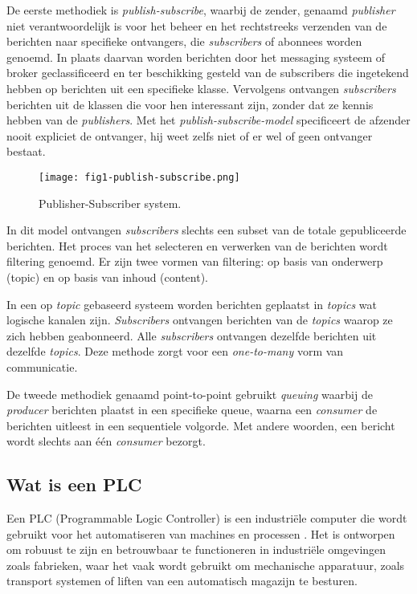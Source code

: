 De eerste methodiek is \emph{publish-subscribe}, waarbij de zender, genaamd \emph{publisher} niet verantwoordelijk is voor het beheer 
en het rechtstreeks verzenden van de berichten naar specifieke ontvangers, die \emph{subscribers} of abonnees worden genoemd. 
In plaats daarvan worden berichten door het messaging systeem of broker geclassificeerd en ter 
beschikking gesteld van de subscribers die ingetekend hebben op berichten uit een specifieke klasse.
Vervolgens ontvangen \emph{subscribers} berichten uit de klassen die voor hen interessant zijn, zonder dat ze kennis hebben van de \emph{publishers}.
Met het \emph{publish-subscribe-model} specificeert de afzender nooit expliciet de ontvanger,
hij weet zelfs niet of er wel of geen ontvanger bestaat.
\newline

\begin{figure}[h]
  \centering
  \texttt{[image: fig1-publish-subscribe.png]}
  \caption{\label{fig:img}Publisher-Subscriber system\autocite{Sharvari2019}.}
\end{figure}

In dit model ontvangen \emph{subscribers} slechts een subset van de totale gepubliceerde berichten. 
Het proces van het selecteren en verwerken van de berichten wordt filtering genoemd. 
Er zijn twee vormen van filtering: op basis van onderwerp (topic) en op basis van inhoud (content).
\newline

In een op \emph{topic} gebaseerd systeem worden berichten geplaatst in \emph{topics} wat logische kanalen zijn.
\emph{Subscribers} ontvangen berichten van de \emph{topics} waarop ze zich hebben geabonneerd.
Alle \emph{subscribers} ontvangen dezelfde berichten uit dezelfde \emph{topics}. 
Deze methode zorgt voor een \emph{one-to-many} vorm van communicatie.
\newline

De tweede methodiek genaamd point-to-point gebruikt \emph{queuing} waarbij de \emph{producer} berichten plaatst in een specifieke queue, 
waarna een \emph{consumer} de berichten uitleest in een sequentiele volgorde. 
Met andere woorden, een bericht wordt slechts aan één \emph{consumer} bezorgt.

\subsection{Wat is een PLC}
Een PLC (Programmable Logic Controller) is een industriële computer die wordt gebruikt voor het automatiseren van machines en processen \autocite{Bolton2015}. 
Het is ontworpen om robuust te zijn en betrouwbaar te functioneren in industriële omgevingen zoals fabrieken, 
waar het vaak wordt gebruikt om mechanische apparatuur, zoals transport systemen of liften van een automatisch magazijn te besturen.

